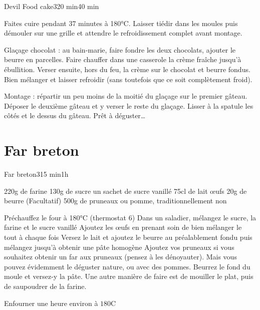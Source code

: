 {\begin{recette}{Devil Food cake}{3}{20 min}{40 min}
\begin{cuisson}
Faites cuire pendant 37 minutes à 180°C. Laisser tiédir dans les moules puis démouler sur une grille et attendre le refroidissement complet avant montage.

Glaçage chocolat : au bain-marie, faire fondre les deux chocolats, ajouter le beurre en parcelles. Faire chauffer dans une casserole la crème fraîche jusqu’à ébullition. Verser ensuite, hors du feu, la crème sur le chocolat et beurre fondus. Bien mélanger et laisser refroidir (sans toutefois que ce soit complètement froid).

Montage : répartir un peu moins de la moitié du glaçage sur le premier gâteau. Déposer le deuxième gâteau et y verser le reste du glaçage. Lisser à la spatule les côtés et le dessus du gâteau. Prêt à déguster…
\end{cuisson}
\end{recette}

\section{Far breton}
\begin{recette}{Far breton}{3}{15 min}{1h}
\begin{ingredients}
\ingredient 220g de farine
\ingredient 130g de sucre
\ingredient un sachet de sucre vanillé
\ingredient 75cl de lait
 œufs
\ingredient 20g de beurre
\ingredient (Facultatif) 500g de pruneaux ou pomme, traditionnellement non
\end{ingredients}

\begin{preparation}
\etape Préchauffez le four à 180°C (thermostat 6)
\etape Dans un saladier, mélangez le sucre, la farine et le sucre vanillé
\etape Ajoutez les œufs en prenant soin de bien mélanger le tout à chaque fois
\etape Versez le lait et ajoutez le beurre au préalablement fondu puis mélangez jusqu'à obtenir une pâte homogène
\etape Ajoutez vos pruneaux si vous souhaitez obtenir un far aux pruneaux (pensez à les dénoyauter). Mais vous pouvez 
évidemment le déguster nature, ou avec des pommes.
\etape Beurrez le fond du moule et versez-y la pâte. Une autre manière de faire est de mouiller le plat, puis de saupoudrer de 
la farine.
\end{preparation}

\begin{cuisson}
Enfourner une heure environ à $180$\degres C
\end{cuisson}
\end{recette}

}
